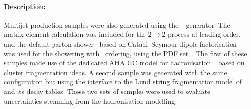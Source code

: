 \paragraph{Description:}

Multijet production samples were also generated using the \SHERPA[2.2.5]~\cite{Bothmann:2019yzt} generator. 
The matrix element calculation was included for the $2\rightarrow2$ process at leading order, and the default \SHERPA parton
shower~\cite{Schumann:2007mg} based on Catani--Seymour dipole factorisation was used for the showering with \pt\
ordering, using the \CT[14nnlo] PDF set~\cite{Dulat:2015mca}.
The first of these samples made use of the dedicated \SHERPA AHADIC model for hadronisation~\cite{Winter:2003tt}, 
based on cluster fragmentation ideas. A second sample was generated with the same configuration but using the \SHERPA interface to
the Lund string fragmentation model of \PYTHIA[6]~\cite{Sjostrand:2006za} and its decay tables.  
These two sets of samples were used to evaluate uncertainties stemming from the hadronisation modelling. 



